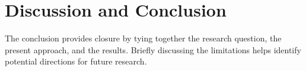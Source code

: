 
\chapter{Discussion and Conclusion}
\label{ch:conclusion}

The conclusion provides closure by tying together the research question, the present approach, and the results.
Briefly discussing the limitations helps identify potential directions for future research.






